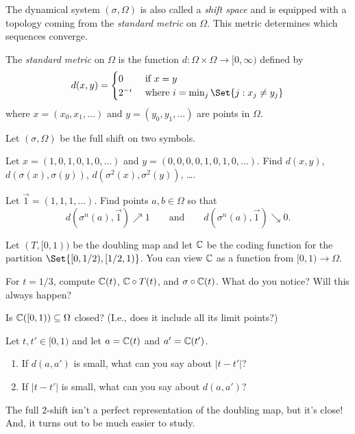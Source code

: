 	The dynamical system $(\sigma, \Omega)$ is also called a \emph{shift space} and is equipped
	with a topology coming from the \emph{standard metric} on $\Omega$. This metric determines which
	sequences converge.

	\begin{definition}
		The \emph{standard metric} on $\Omega$ is the function $d:\Omega\times \Omega\to[0,\infty)$ defined by
		\[
			d(x,y) = \begin{cases}
				0 & \text{ if }x=y\\
				2^{-i}&\text{ where } i=\min_j\Set{j:x_j\neq y_j}
			\end{cases}
		\]
		where $x=(x_0,x_1,\ldots)$ and $y=(y_0,y_1,\ldots)$ are points in $\Omega$.
	\end{definition}

	\question
	Let $(\sigma,\Omega)$ be the full shift on two symbols.
	\begin{parts}
		\item Let $x=(1,0,1,0,1,0,\ldots)$ and $y=(0,0,0,0,1,0,1,0,\ldots)$.
			Find $d(x,y)$, $d(\sigma(x),\sigma(y))$, $d(\sigma^2(x),\sigma^2(y))$, \ldots.
		\item Let $\vec 1 = (1,1,1,\ldots)$. Find points $a,b\in\Omega$ so that 
			\[
				d(\sigma^n(a),\vec 1)\nearrow 1
			\qquad\text{and}\qquad
				d(\sigma^n(a),\vec 1)\searrow 0.
			\]

		\item Let $(T,[0,1))$ be the doubling map and let $\mathbb{C}$ be the coding function
			for the partition $\Set{[0,1/2),[1/2,1)}$. You can view $\mathbb{C}$ as a function
			from $[0,1)\to\Omega$.

			For $t=1/3$, compute $\mathbb{C}(t)$, $\mathbb{C}\circ T(t)$, and $\sigma\circ \mathbb{C}(t)$. What
			do you notice? Will this always happen?
		\item Is $\mathbb{C}([0,1))\subseteq \Omega$ closed? (I.e., does it include all its limit points?)
		\item Let $t,t'\in[0,1)$ and let $a=\mathbb{C}(t)$ and $a'=\mathbb{C}(t')$.
			\begin{enumerate}
				\item If $d(a,a')$ is small, what can you say about $|t-t'|$?
				\item If $|t-t'|$ is small, what can you say about $d(a,a')$?
			\end{enumerate}
	\end{parts}

	\newpage
	The full $2$-shift isn't a perfect representation of the doubling map, but it's close! And, it
	turns out to be much easier to study.


